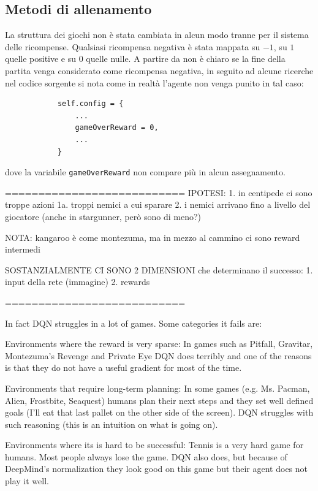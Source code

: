 \documentclass[twoside,twocolumn,10pt]{extarticle}
\theoremstyle{definition}
\begin{document}
	\subsection{Metodi di allenamento}
		La struttura dei giochi non è stata cambiata in alcun modo tranne per il sistema delle ricompense. Qualsiasi ricompensa negativa è stata mappata su $-1$, su $1$ quelle positive e su $0$ quelle nulle. A partire da \cite{bib:dqn} non è chiaro se la fine della partita venga considerato come ricompensa negativa, in seguito ad alcune ricerche nel codice sorgente si nota come in realtà l'agente non venga punito in tal caso:
		\begin{verbatim}
			self.config = {
				...
				gameOverReward = 0,
				...
			}
		\end{verbatim}
		dove la variabile \texttt{gameOverReward} non compare più in alcun assegnamento.
		
	
	
	===========================
	IPOTESI: 1. in centipede ci sono troppe azioni
			 	1a. troppi nemici a cui sparare
		     2. i nemici arrivano fino a livello del giocatore 
		     		(anche in stargunner, però sono di meno?)
		     		
	NOTA:
			kangaroo è come montezuma, ma in mezzo al cammino ci sono reward intermedi
			
	SOSTANZIALMENTE CI SONO 2 DIMENSIONI che determinano il successo:
		1. input della rete (immagine)
		2. rewards
	
	
	===========================
	
	In fact DQN struggles in a lot of games. Some categories it fails are:
	
	Environments where the reward is very sparse: In games such as Pitfall, Gravitar, Montezuma's Revenge and Private Eye DQN does terribly and one of the reasons is that they do not have a useful gradient for most of the time.
	
	Environments that require long-term planning: In some games (e.g. Ms. Pacman, Alien, Frostbite, Seaquest) humans plan their next steps and they set well defined goals (I'll eat that last pallet on the other side of the screen). DQN struggles with such reasoning (this is an intuition on what is going on).
	
	Environments where its is hard to be successful: Tennis is a very hard game for humans. Most people always lose the game. DQN also does, but because of DeepMind's normalization they look good on this game but their agent does not play it well.
	
\end{document}
